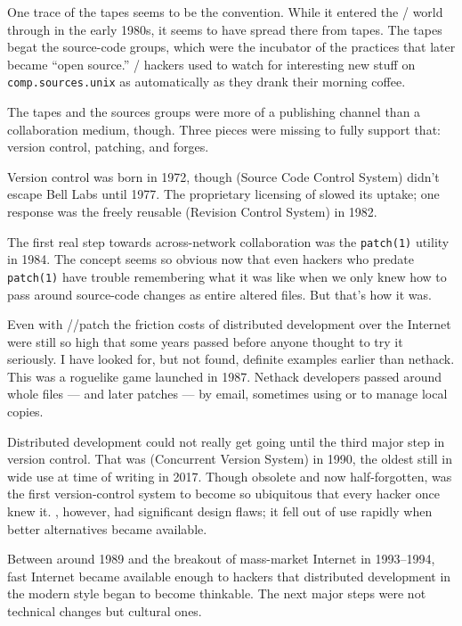 One trace of the  tapes seems to be the  convention. While it
entered the \UNIX/ world through  in the early 1980s, it seems to have
spread there from  tapes. The  tapes begat the  source-code
groups, which were the incubator of the practices that later became ``open
source.'' \UNIX/ hackers used to watch for interesting new stuff on
{\tt comp.sources.unix} as automatically as they drank their morning coffee.

The  tapes and the  sources groups were more of a publishing channel
than a collaboration medium, though. Three pieces were missing to fully support
that: version control, patching, and forges.

Version control was born in 1972, though  (Source Code Control System)
didn't escape Bell Labs until 1977. The proprietary licensing of  slowed
its uptake; one response was the freely reusable  (Revision Control System)
in 1982.

The first real step towards across-network collaboration was the {\tt patch(1)}
utility in 1984. The concept seems so obvious now that even hackers who predate
{\tt patch(1)} have trouble remembering what it was like when we only knew how to
pass around source-code changes as entire altered files. But that's how it was.

Even with //patch the friction costs of distributed development over the
Internet were still so high that some years passed before anyone thought to try
it seriously. I have looked for, but not found, definite examples earlier than
nethack. This was a roguelike game launched in 1987. Nethack developers passed
around whole files --- and later patches --- by email, sometimes using  or 
to manage local copies.

Distributed development could not really get going until the third major step
in version control. That was  (Concurrent Version System) in 1990, the
oldest  still in wide use at time of writing in 2017. Though obsolete and
now half-forgotten,  was the first version-control system to become so
ubiquitous that every hacker once knew it. , however, had significant design
flaws; it fell out of use rapidly when better alternatives became
available.

Between around 1989 and the breakout of mass-market Internet in 1993--1994, fast
Internet became available enough to hackers that distributed development in the
modern style began to become thinkable. The next major steps were not technical
changes but cultural ones.

